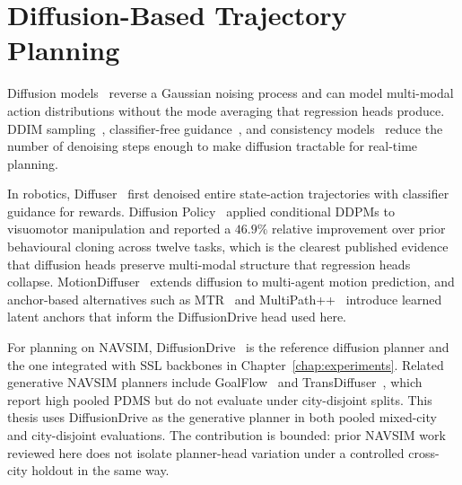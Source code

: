 \section{Diffusion-Based Trajectory Planning}
\label{sec:rw-diffusion}

Diffusion models~\cite{ho-ddpm-2020} reverse a Gaussian noising process and can model multi-modal action distributions without the mode averaging that regression heads produce. DDIM sampling~\cite{song-ddim-2021}, classifier-free guidance~\cite{ho-cfg-2022}, and consistency models~\cite{song-consistency-2023} reduce the number of denoising steps enough to make diffusion tractable for real-time planning.

In robotics, Diffuser~\cite{janner-diffuser-2022} first denoised entire state-action trajectories with classifier guidance for rewards. Diffusion Policy~\cite{chi-diffusion-policy-2023} applied conditional DDPMs to visuomotor manipulation and reported a $46.9\%$ relative improvement over prior behavioural cloning across twelve tasks, which is the clearest published evidence that diffusion heads preserve multi-modal structure that regression heads collapse. MotionDiffuser~\cite{jiang-motiondiffuser-2023} extends diffusion to multi-agent motion prediction, and anchor-based alternatives such as MTR~\cite{shi-mtr-2022} and MultiPath++~\cite{varadarajan-multipathpp-2022} introduce learned latent anchors that inform the DiffusionDrive head used here.

For planning on NAVSIM, DiffusionDrive~\cite{jia-diffusiondrive-2025} is the reference diffusion planner and the one integrated with SSL backbones in Chapter~\ref{chap:experiments}. Related generative NAVSIM planners include GoalFlow~\cite{xing-goalflow-2025} and TransDiffuser~\cite{jiang-transdiffuser-2025}, which report high pooled PDMS but do not evaluate under city-disjoint splits. This thesis uses DiffusionDrive as the generative planner in both pooled mixed-city and city-disjoint evaluations. The contribution is bounded: prior NAVSIM work reviewed here does not isolate planner-head variation under a controlled cross-city holdout in the same way.
